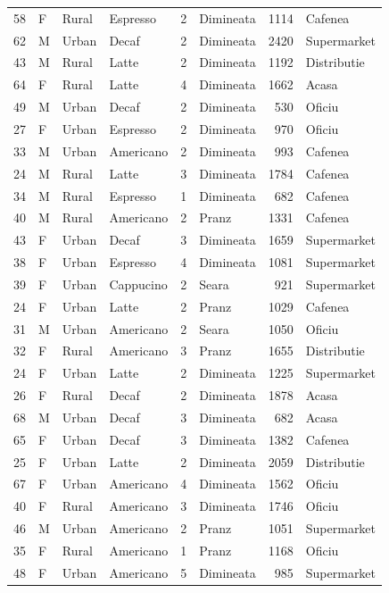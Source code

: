 \documentclass[12pt,a4paper]{report}
\begin{document}
\begin{appendices}
\begin{longtable}{rlllrlrl}
58 & F & Rural & Espresso & 2 & Dimineata & 1114 & Cafenea \\
62 & M & Urban & Decaf & 2 & Dimineata & 2420 & Supermarket \\
43 & M & Rural & Latte & 2 & Dimineata & 1192 & Distributie \\
64 & F & Rural & Latte & 4 & Dimineata & 1662 & Acasa \\
49 & M & Urban & Decaf & 2 & Dimineata & 530 & Oficiu \\
27 & F & Urban & Espresso & 2 & Dimineata & 970 & Oficiu \\
33 & M & Urban & Americano & 2 & Dimineata & 993 & Cafenea \\
24 & M & Rural & Latte & 3 & Dimineata & 1784 & Cafenea \\
34 & M & Rural & Espresso & 1 & Dimineata & 682 & Cafenea \\
40 & M & Rural & Americano & 2 & Pranz & 1331 & Cafenea \\
43 & F & Urban & Decaf & 3 & Dimineata & 1659 & Supermarket \\
38 & F & Urban & Espresso & 4 & Dimineata & 1081 & Supermarket \\
39 & F & Urban & Cappucino & 2 & Seara & 921 & Supermarket \\
24 & F & Urban & Latte & 2 & Pranz & 1029 & Cafenea \\
31 & M & Urban & Americano & 2 & Seara & 1050 & Oficiu \\
32 & F & Rural & Americano & 3 & Pranz & 1655 & Distributie \\
24 & F & Urban & Latte & 2 & Dimineata & 1225 & Supermarket \\
26 & F & Rural & Decaf & 2 & Dimineata & 1878 & Acasa \\
68 & M & Urban & Decaf & 3 & Dimineata & 682 & Acasa \\
65 & F & Urban & Decaf & 3 & Dimineata & 1382 & Cafenea \\
25 & F & Urban & Latte & 2 & Dimineata & 2059 & Distributie \\
67 & F & Urban & Americano & 4 & Dimineata & 1562 & Oficiu \\
40 & F & Rural & Americano & 3 & Dimineata & 1746 & Oficiu \\
46 & M & Urban & Americano & 2 & Pranz & 1051 & Supermarket \\
35 & F & Rural & Americano & 1 & Pranz & 1168 & Oficiu \\
48 & F & Urban & Americano & 5 & Dimineata & 985 & Supermarket \\

\end{longtable}
\end{appendices}
\end{document}
